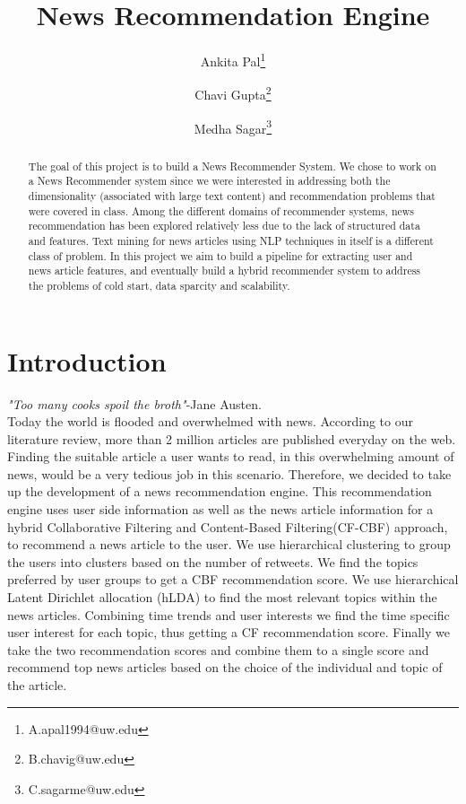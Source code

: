 \documentclass{article}
\title{News Recommendation Engine}
\author[1]{Ankita Pal\thanks{A.apal1994@uw.edu}}
\author[1]{Chavi Gupta\thanks{B.chavig@uw.edu}}
\author[1]{Medha Sagar\thanks{C.sagarme@uw.edu}}
\affil[1]{Department of Data Science, University of Washington}
\begin{document}
\maketitle

\begin{abstract}
    The goal of this project is to build a News Recommender System. We chose to work on a News Recommender system since we were interested in addressing both the dimensionality (associated with large text content) and recommendation problems that were covered in class. Among the different domains of recommender systems, news recommendation has been explored relatively less due to the lack of structured data and features. Text mining for news articles using NLP techniques in itself is a different class of problem. In this project we aim to build a pipeline for extracting user and news article features, and eventually build a hybrid recommender system to address the problems of cold start, data sparcity and scalability. 
\end{abstract}

\section{Introduction}

\textit{"Too many cooks spoil the broth"}-Jane Austen.\\ Today the world is flooded and overwhelmed with news. According to our literature review, more than 2 million articles are published everyday on the web. Finding the suitable article a user wants to read, in this overwhelming amount of news, would be a very tedious job in this scenario. Therefore, we decided to take up the development of a news recommendation engine. This recommendation engine uses user side information as well as the news article information for a hybrid Collaborative Filtering and Content-Based Filtering(CF-CBF) approach, to recommend a news article to the user. We use hierarchical clustering to group the users into clusters based on the number of retweets. We find the topics preferred by user groups to get a CBF recommendation score. We use hierarchical Latent Dirichlet allocation (hLDA) to find the most relevant topics within the news articles. Combining time trends and user interests we find the time specific user interest for each topic, thus getting a CF recommendation score. Finally we take the two recommendation scores and combine them to a single score and recommend top news articles based on the choice of the individual and topic of the article.
\end{document}

